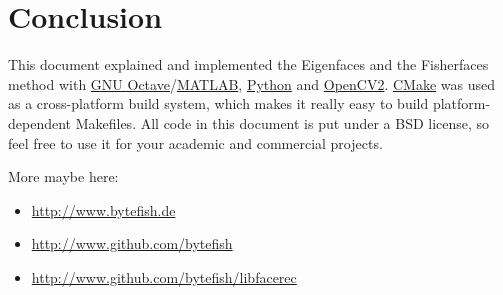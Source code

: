 \section{Conclusion}

This document explained and implemented the Eigenfaces \cite{PT91} and the Fisherfaces \cite{belhumeru97} method with \href{http://www.gnu.org/software/octave}{GNU Octave}/\href{http://mathworks.com}{MATLAB}, \href{http://www.python.org}{Python} and \href{http://opencv.willowgarage.com}{OpenCV2}. \href{http://www.cmake.org}{CMake} was used as a cross-platform build system, which makes it really easy to build platform-dependent Makefiles. All code in this document is put under a BSD license, so feel free to use it for your academic and commercial projects. 

More maybe here: 

\begin{itemize}
	\item \url{http://www.bytefish.de}
	\item \url{http://www.github.com/bytefish}
	\item \url{http://www.github.com/bytefish/libfacerec}
\end{itemize}

